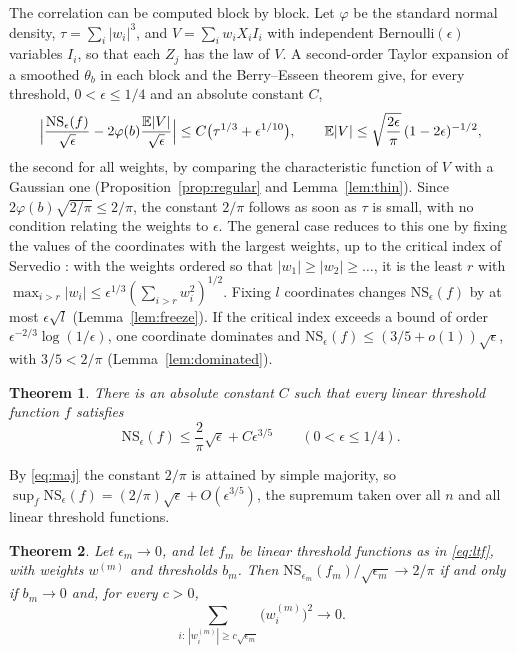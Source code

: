 \documentclass[11pt]{amsart}
\newtheorem{theorem}{Theorem}[section]
\theoremstyle{remark}
\numberwithin{equation}{section}
\newcommand{\EE}{\mathbb{E}}
\begin{document}
The correlation can be computed block by block. Let $\varphi$ be the standard normal density, $\tau=\sum_i|w_i|^3$, and $V=\sum_iw_iX_iI_i$ with independent Bernoulli$(\epsilon)$ variables $I_i$, so that each $Z_j$ has the law of $V$. A second-order Taylor expansion of a smoothed $\theta_b$ in each block and the Berry--Esseen theorem give, for every threshold, $0<\epsilon\le1/4$ and an absolute constant $C$,
\[
\Bigl|\frac{\mathrm{NS}_\epsilon(f)}{\sqrt\epsilon}-2\varphi(b)\frac{\EE|V|}{\sqrt\epsilon}\Bigr|\le C\bigl(\tau^{1/3}+\epsilon^{1/10}\bigr),
\qquad
\EE|V|\le\sqrt{\frac{2\epsilon}{\pi}}\,(1-2\epsilon)^{-1/2},
\]
the second for all weights, by comparing the characteristic function of $V$ with a Gaussian one (Proposition~\ref{prop:regular} and Lemma~\ref{lem:thin}). Since $2\varphi(b)\sqrt{2/\pi}\le2/\pi$, the constant $2/\pi$ follows as soon as $\tau$ is small, with no condition relating the weights to $\epsilon$. The general case reduces to this one by fixing the values of the coordinates with the largest weights, up to the critical index of Servedio \cite{Ser07}: with the weights ordered so that $|w_1|\ge|w_2|\ge\dots$, it is the least $r$ with $\max_{i>r}|w_i|\le\epsilon^{1/3}(\sum_{i>r}w_i^2)^{1/2}$. Fixing $l$ coordinates changes $\mathrm{NS}_\epsilon(f)$ by at most $\epsilon\sqrt l$ (Lemma~\ref{lem:freeze}). If the critical index exceeds a bound of order $\epsilon^{-2/3}\log(1/\epsilon)$, one coordinate dominates and $\mathrm{NS}_\epsilon(f)\le(3/5+o(1))\sqrt\epsilon$, with $3/5<2/\pi$ (Lemma~\ref{lem:dominated}).

\begin{theorem}\label{thm:main}
There is an absolute constant $C$ such that every linear threshold function $f$ satisfies
\[
\mathrm{NS}_\epsilon(f)\le\frac2\pi\sqrt\epsilon+C\epsilon^{3/5}\qquad(0<\epsilon\le1/4).
\]
\end{theorem}

By \eqref{eq:maj} the constant $2/\pi$ is attained by simple majority, so $\sup_f\mathrm{NS}_\epsilon(f)=(2/\pi)\sqrt\epsilon+O(\epsilon^{3/5})$, the supremum taken over all $n$ and all linear threshold functions.

\begin{theorem}\label{thm:char}
Let $\epsilon_m\to0$, and let $f_m$ be linear threshold functions as in \eqref{eq:ltf}, with weights $w^{(m)}$ and thresholds $b_m$. Then $\mathrm{NS}_{\epsilon_m}(f_m)/\sqrt{\epsilon_m}\to2/\pi$ if and only if $b_m\to0$ and, for every $c>0$,
\begin{equation}\label{eq:regular}
\sum_{i:\,|w^{(m)}_i|\ge c\sqrt{\epsilon_m}}\bigl(w^{(m)}_i\bigr)^2\to0.
\end{equation}
\end{theorem}
\end{document}
